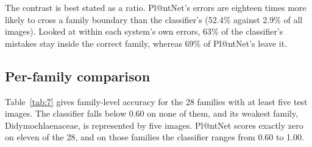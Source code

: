 \documentclass[preprint,12pt,authoryear]{elsarticle}
\begin{document}
The contrast is best stated as a ratio. Pl@ntNet's errors are eighteen times more likely to cross a family boundary than the classifier's (52.4\% against 2.9\% of all images). Looked at within each system's own errors, 63\% of the classifier's mistakes stay inside the correct family, whereas 69\% of Pl@ntNet's leave it.

\setcounter{section}{8}

\setcounter{subsection}{2}

\subsection{Per-family comparison}\label{sec:8.3}

Table~\ref{tab:7} gives family-level accuracy for the 28 families with at least five test images. The classifier falls below 0.60 on none of them, and its weakest family, Didymochlaenaceae, is represented by five images. Pl@ntNet scores exactly zero on eleven of the 28, and on those families the classifier ranges from 0.60 to 1.00.
\end{document}
